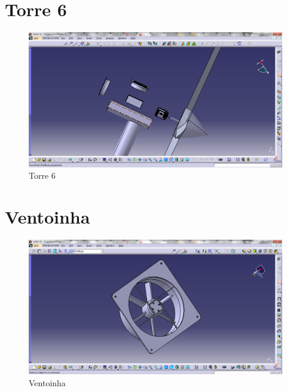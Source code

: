 \section{Torre 6}
\begin{figure}[!htbp]
	  \centering
	  \includegraphics[scale=0.45]{editaveis/figuras/C_torre6}
	  \caption[Torre6]{Torre 6}
	  \label{Torre6}
	\end{figure}
	\FloatBarrier

\section{Ventoinha}
\begin{figure}[!htbp]
	  \centering
	  \includegraphics[scale=0.45]{editaveis/figuras/C_Ventoinha}
	  \caption[Ventoinha]{Ventoinha}
	  \label{Torre6}
	\end{figure}
	\FloatBarrier
	